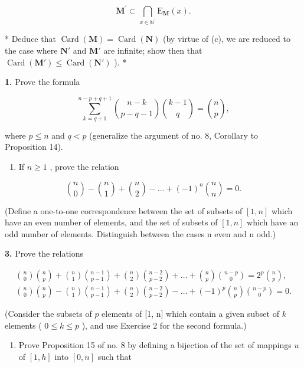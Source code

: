 \[
\mathbf {M} ^ {\prime} \subset \bigcap_ {x \in \mathbb {N} ^ {\prime}} \mathrm{E} _ {\mathbf {M}} (x).
\]

* Deduce that \(\operatorname{Card}(\mathbf{M}) = \operatorname{Card}(\mathbf{N})\) (by virtue of (c), we are reduced to the case where \(\mathbf{N}'\) and \(\mathbf{M}'\) are infinite; show then that \(\operatorname{Card}(\mathbf{M}') \leqslant \operatorname{Card}(\mathbf{N}')\) ). *

\exercisegroup

\textbf{1.} Prove the formula

\[
\sum_ {k = q + 1} ^ {n - p + q + 1} \binom {n - k} {p - q - 1} \binom {k - 1} {q} = \binom {n} {p},
\]

where \(p \leqslant n\) and \(q < p\) (generalize the argument of no. 8, Corollary to Proposition 14).

\begin{enumerate}
\def\labelenumi{\arabic{enumi}.}
\setcounter{enumi}{1}
\tightlist
\item
  If \(n \geqslant 1\) , prove the relation
\end{enumerate}

\[
\binom {n} {0} - \binom {n} {1} + \binom {n} {2} - \dots + (- 1) ^ {n} \binom {n} {n} = 0.
\]

(Define a one-to-one correspondence between the set of subsets of \([1, n]\) which have an even number of elements, and the set of subsets of \([1, n]\) which have an odd number of elements. Distinguish between the cases n even and n odd.)

\textbf{3.} Prove the relations

\[
\begin{array}{l} \binom {n} {0} \binom {n} {p} + \binom {n} {1} \binom {n - 1} {p - 1} + \binom {n} {2} \binom {n - 2} {p - 2} + \dots + \binom {n} {p} \binom {n - p} {0} = 2 ^ {p} \binom {n} {p}, \\ \binom {n} {0} \binom {n} {p} - \binom {n} {1} \binom {n - 1} {p - 1} + \binom {n} {2} \binom {n - 2} {p - 2} - \dots + (- 1) ^ {p} \binom {n} {p} \binom {n - p} {0} = 0. \end{array}
\]

(Consider the subsets of \(p\) elements of {[}1, n{]} which contain a given subset of \(k\) elements ( \(0 \leqslant k \leqslant p\) ), and use Exercise 2 for the second formula.)

\begin{enumerate}
\def\labelenumi{\arabic{enumi}.}
\setcounter{enumi}{3}
\tightlist
\item
  Prove Proposition 15 of no. 8 by defining a bijection of the set of mappings \(u\) of \([1, h]\) into \([0, n]\) such that
\end{enumerate}

